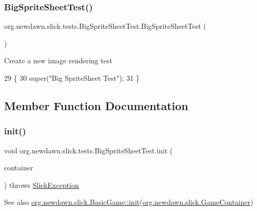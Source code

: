 \subsubsection{\texorpdfstring{Big\+Sprite\+Sheet\+Test()}{BigSpriteSheetTest()}}
{\footnotesize\ttfamily org.\+newdawn.\+slick.\+tests.\+Big\+Sprite\+Sheet\+Test.\+Big\+Sprite\+Sheet\+Test (\begin{DoxyParamCaption}{ }\end{DoxyParamCaption})\hspace{0.3cm}{\ttfamily [inline]}}

Create a new image rendering test 
\begin{DoxyCode}
29                                 \{
30         super(\textcolor{stringliteral}{"Big SpriteSheet Test"});
31     \}
\end{DoxyCode}


\subsection{Member Function Documentation}
\mbox{\label{classorg_1_1newdawn_1_1slick_1_1tests_1_1_big_sprite_sheet_test_aef0faf2ee6a42c1639e3a40918d726da}} 
\subsubsection{\texorpdfstring{init()}{init()}}
{\footnotesize\ttfamily void org.\+newdawn.\+slick.\+tests.\+Big\+Sprite\+Sheet\+Test.\+init (\begin{DoxyParamCaption}\item[{\mbox{\hyperlink{classorg_1_1newdawn_1_1slick_1_1_game_container}{Game\+Container}}}]{container }\end{DoxyParamCaption}) throws \mbox{\hyperlink{classorg_1_1newdawn_1_1slick_1_1_slick_exception}{Slick\+Exception}}\hspace{0.3cm}{\ttfamily [inline]}}

\begin{DoxySeeAlso}{See also}
\mbox{\hyperlink{classorg_1_1newdawn_1_1slick_1_1_basic_game_a8af0900217e4d389249f71367b22d114}{org.\+newdawn.\+slick.\+Basic\+Game\+::init}}(\mbox{\hyperlink{classorg_1_1newdawn_1_1slick_1_1_game_container}{org.\+newdawn.\+slick.\+Game\+Container}}) 
\end{DoxySeeAlso}


